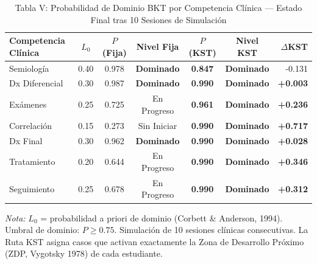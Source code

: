 \begin{table}[htbp]
\centering
\caption{Tabla V: Probabilidad de Dominio BKT por Competencia Clínica — Estado Final tras 10 Sesiones de Simulación}
\label{tab:bkt_competencias}
\begin{tabular}{lcccccr}
\toprule
\textbf{Competencia Clínica} & \textbf{$L_0$} & \textbf{$P$(Fija)} & \textbf{Nivel Fija} & \textbf{$P$(KST)} & \textbf{Nivel KST} & \textbf{$\Delta$KST} \\
\midrule
Semiología & 0.40 & 0.978 & \textbf{Dominado} & \textbf{0.847} & \textbf{Dominado} & -0.131 \\
Dx Diferencial & 0.30 & 0.987 & \textbf{Dominado} & \textbf{0.990} & \textbf{Dominado} & \textbf{+0.003} \\
Exámenes & 0.25 & 0.725 & En Progreso & \textbf{0.961} & \textbf{Dominado} & \textbf{+0.236} \\
Correlación & 0.15 & 0.273 & Sin Iniciar & \textbf{0.990} & \textbf{Dominado} & \textbf{+0.717} \\
Dx Final & 0.30 & 0.962 & \textbf{Dominado} & \textbf{0.990} & \textbf{Dominado} & \textbf{+0.028} \\
Tratamiento & 0.20 & 0.644 & En Progreso & \textbf{0.990} & \textbf{Dominado} & \textbf{+0.346} \\
Seguimiento & 0.25 & 0.678 & En Progreso & \textbf{0.990} & \textbf{Dominado} & \textbf{+0.312} \\
\bottomrule
\end{tabular}
\vspace{1mm}
\begin{minipage}{\linewidth}
\footnotesize
\textit{Nota:} $L_0$ = probabilidad a priori de dominio (Corbett \& Anderson, 1994). Umbral de dominio: $P \ge 0.75$. Simulación de 10 sesiones clínicas consecutivas. La Ruta KST asigna casos que activan exactamente la Zona de Desarrollo Próximo (ZDP, Vygotsky 1978) de cada estudiante.
\end{minipage}
\end{table}

